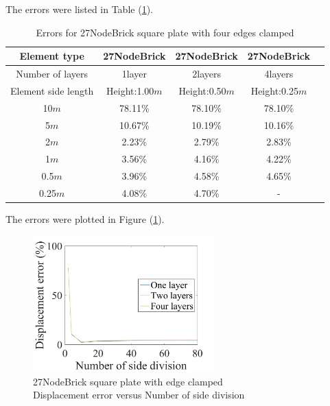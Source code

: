\documentclass[fleqn,11pt]{article}
\begin{document}

The errors were listed in Table (\ref{table Errors for 27NodeBrick square plate with four edges clamped}).

\begin{table}[H]
  \centering
  \caption{Errors for 27NodeBrick square plate with four edges clamped}
  \label{table Errors for 27NodeBrick square plate with four edges clamped}
\begin{tabular}{|c|c|c|c|c|}
\hline
Element type     & 27NodeBrick     & 27NodeBrick     & 27NodeBrick      \\ \hline
Number of layers & 1layer         & 2layers         & 4layers          \\ \hline
Element side length & Height:1.00$m$ & Height:0.50$m$ & Height:0.25$m$  \\ \hline
10$m$            & 78.11\% & 78.10\% & 78.10\%       \\ \hline
5$m$             & 10.67\% & 10.19\% & 10.16\%       \\ \hline
2$m$             & 2.23\%  & 2.79\%  & 2.83\%        \\ \hline
1$m$             & 3.56\%  & 4.16\%  & 4.22\%        \\ \hline
0.5$m$           & 3.96\%  & 4.58\%  & 4.65\%        \\ \hline
0.25$m$          & 4.08\%  & 4.70\%  &    -         \\
\hline
\end{tabular}
\end{table}

The errors were plotted in Figure (\ref{fig 27NodeBrick square plate with edge clamped}).

\begin{figure}[H]
  \centering
  \includegraphics[width=7cm]{../Figure-files/error27brick_square_plate_clamped100.jpeg}
  \captionsetup{justification=centering,margin=3cm}
  \caption{27NodeBrick square plate with edge clamped\\
      Displacement error   versus   Number of side division}
  \label{fig 27NodeBrick square plate with edge clamped}
\end{figure}
\end{document}
